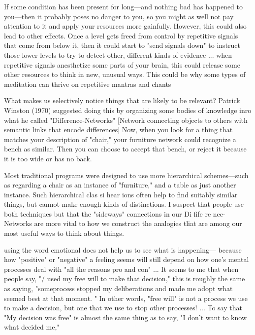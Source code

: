 \documentclass[10pt,a4paper]{article}
\begin{document}
If some condition has been present for long—and nothing bad has happened to you—then it probably poses no danger to you, so you might as well not pay attention to it and apply your resources more gainfully. However, this could also lead to other effects. Once a level gets freed from control by repetitive signals that come from below it, then it could start to "send signals down" to instruct those lower levels to try to detect other, different kinds of evidence
...
when repetitive signals anesthetize some parts of your brain, this could release some other resources to think in new, unusual ways. This could be why some types of meditation can thrive on repetitive mantras and chants \cite[p.~198]{minsky}

What makes us selectively notice things that are likely to be relevant? Patrick Winston (1970) suggested doing this by organizing some bodies of knowledge inro what he called "Difference-Networks"
[Network connecting objects to others with semantic links that encode differences]
Now, when you look for a thing that matches your description of "chair," your furniture network could recognize a bench as similar. Then you can choose to accept that bench, or reject it because it is too wide or has no back. \cite[p.~200-201]{minsky}

Most traditional programs were designed to use more hierarchical schemes—such as regarding a chair as an instance of "furniture," and a table as just another instance. Such hierarchical clas si hear ions often help to find suitably similar things, but cannot make enough kinds of distinctions. I suspect that people use both techniques but that the "sideways" connections in our Di fife re nee- Networks are more vital to how we construct the analogies tliat are among our most useful ways to think about things. \cite[p.~201-202]{minsky}


using the word emotional does not help us to see what is happening— because how "positive" or "negative" a feeling seems will still depend on how one's mental processes deal with "all the reasons pro and con"
...
It seems to me that when people say, "/ used my free will to make that decision," this is roughly the same as saying, "someprocess stopped my deliberations and made me adopt what seemed best at that moment. " In other words, "free will" is not a process we use to make a decision, but one that we use to stop other processes!
...
To say that "My decision was free" is almost the same thing as to say, "I don't want to know what decided me," \cite[p.~204]{minsky}
\end{document}
